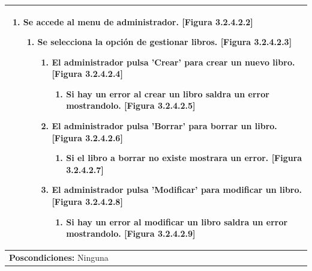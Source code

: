 ﻿\documentclass{report}
\begin{document}
\begin{center}
\begin{longtable}{|p{\linewidth}|}
                            \begin{enumerate}
                                \item Se accede al menu de administrador. [Figura 3.2.4.2.2]
                                \begin{enumerate}
                                    \item Se selecciona la opción de gestionar libros. [Figura 3.2.4.2.3]
                                    \begin{enumerate}
                                        \item El administrador pulsa 'Crear' para crear un nuevo libro. [Figura 3.2.4.2.4]
                                        \begin{enumerate}
                                            \item Si hay un error al crear un libro saldra un error mostrandolo. [Figura 3.2.4.2.5]
                                        \end{enumerate}
                                        \item El administrador pulsa 'Borrar' para borrar un libro. [Figura 3.2.4.2.6]
                                        \begin{enumerate}
                                            \item Si el libro a borrar no existe mostrara un error. [Figura 3.2.4.2.7]
                                        \end{enumerate}
                                        \item El administrador pulsa 'Modificar' para modificar un libro. [Figura 3.2.4.2.8]
                                        \begin{enumerate}
                                            \item Si hay un error al modificar un libro saldra un error mostrandolo. [Figura 3.2.4.2.9]
                                        \end{enumerate}
                                    \end{enumerate}
                                \end{enumerate} 
                            \end{enumerate}\\
                            \hline
                            \textbf{Poscondiciones:} Ninguna\\
                            \hline

\end{longtable}
\end{center}
\end{document}

